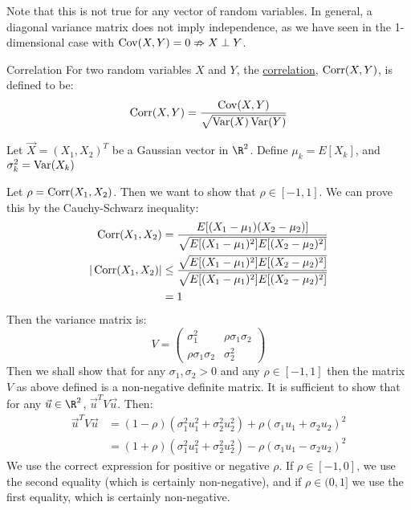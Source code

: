 \documentclass[../Main.tex]{subfiles}
\begin{document}
\begin{remark}
    Note that this is not true for any vector of random variables. In general, a diagonal variance matrix does not imply independence, as we have seen in the 1-dimensional case with $\operatorname{Cov}(X, Y) = 0 \nRightarrow X \perp Y$.
\end{remark}
\begin{definition}{Correlation}
    For two random variables $X$ and $Y$, the \underline{correlation}, $\operatorname{Corr}(X, Y)$, is defined to be:
    \begin{equation*}
        \operatorname{Corr}(X, Y) = \frac{\operatorname{Cov}(X, Y)}{\sqrt{\operatorname{Var}(X)\operatorname{Var}(Y)}}
    \end{equation*}
\end{definition}
\begin{example}
    Let $\vec{X} = (X_1, X_2)^T$ be a Gaussian vector in $\R^2$. Define $\mu_k = E[X_k]$, and $\sigma_k^2 = \operatorname{Var}(X_k)$

    Let $\rho = \operatorname{Corr}(X_1, X_2)$. Then we want to show that $\rho \in [-1, 1]$. We can prove this by the Cauchy-Schwarz inequality:
    \begin{align*}
        \operatorname{Corr}(X_1, X_2) &= \frac{E[(X_1 - \mu_1)(X_2 - \mu_2)]}{\sqrt{E[(X_1 - \mu_1)^2]E[(X_2 - \mu_2)^2]}} \\
        |\operatorname{Corr}(X_1, X_2)| &\leq \frac{\sqrt{E[(X_1 - \mu_1)^2] E[(X_2 - \mu_2)^2]}}{\sqrt{E[(X_1 - \mu_1)^2] E[(X_2 - \mu_2)^2]}} \\
        &= 1
    \end{align*}
    Then the variance matrix is:
    \begin{equation*}
        V =
        \begin{pmatrix}
            \sigma_1^2 & \rho \sigma_1 \sigma_2 \\
            \rho \sigma_1 \sigma_2 & \sigma_2^2
        \end{pmatrix}
    \end{equation*}
    Then we shall show that for any $\sigma_1, \sigma_2 > 0$ and any $\rho \in [-1, 1]$ then the matrix $V$ as above defined is a non-negative definite matrix. It is sufficient to show that for any $\vec{u} \in \R^2$, $\vec{u}^T V \vec{u}$. Then:
    \begin{align*}
        \vec{u}^T V \vec{u} &= (1 - \rho)\left(\sigma_1^2 u_1^2 + \sigma_2^2 u_2^2\right) + \rho(\sigma_1 u_1 + \sigma_2 u_2)^2 \\
        &= (1 + \rho)(\sigma_1^2 u_1^2 + \sigma_2^2 u_2^2) - \rho(\sigma_1 u_1 - \sigma_2 u_2)^2
    \end{align*}
    We use the correct expression for positive or negative $\rho$. If $\rho \in [-1, 0]$, we use the second equality (which is certainly non-negative), and if $\rho \in (0, 1]$ we use the first equality, which is certainly non-negative.


\end{example}
\end{document}
